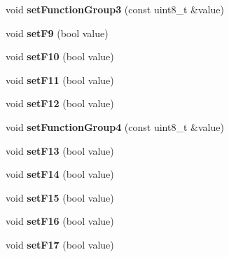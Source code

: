 \begin{DoxyCompactItemize}
\item 
\mbox{\label{classTBT_1_1LocDecoder_a81f9805d0a984a94dab529602ef9ae64}} 
void {\bfseries set\+Function\+Group3} (const uint8\+\_\+t \&value)
\item 
\mbox{\label{classTBT_1_1LocDecoder_a725b9d78cbdbd1e60a9102ddf5b8aaf3}} 
void {\bfseries set\+F9} (bool value)
\item 
\mbox{\label{classTBT_1_1LocDecoder_a9976487964f6167d2d5e084d4ed787b7}} 
void {\bfseries set\+F10} (bool value)
\item 
\mbox{\label{classTBT_1_1LocDecoder_aa732b54dfa7d535cec4aaab105f4c64d}} 
void {\bfseries set\+F11} (bool value)
\item 
\mbox{\label{classTBT_1_1LocDecoder_a8b7c59df79fb92011db6e5e5999ffd28}} 
void {\bfseries set\+F12} (bool value)
\item 
\mbox{\label{classTBT_1_1LocDecoder_a5b7c569ddccfe68faef7136bf27fadb8}} 
void {\bfseries set\+Function\+Group4} (const uint8\+\_\+t \&value)
\item 
\mbox{\label{classTBT_1_1LocDecoder_a90966aa043e13a5f2a8c4f4019c662c9}} 
void {\bfseries set\+F13} (bool value)
\item 
\mbox{\label{classTBT_1_1LocDecoder_a4d74e6b1232f3c716bf624dc1681164a}} 
void {\bfseries set\+F14} (bool value)
\item 
\mbox{\label{classTBT_1_1LocDecoder_aee5779bd1917c16099c77b3d57aedbb8}} 
void {\bfseries set\+F15} (bool value)
\item 
\mbox{\label{classTBT_1_1LocDecoder_a0a1a0f36dbe6b3c0c50eda41eb7b673e}} 
void {\bfseries set\+F16} (bool value)
\item 
\mbox{\label{classTBT_1_1LocDecoder_ad1355610f7158630e75af3df1e4d01c4}} 
void {\bfseries set\+F17} (bool value)
\item 

\end{DoxyCompactItemize}
